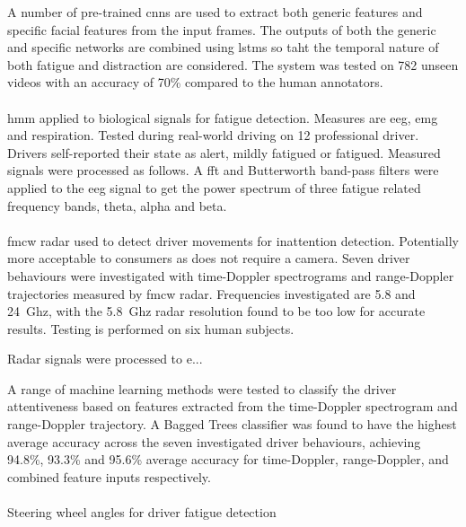 \documentclass[11pt, parskip=half*,twoside=false]{scrbook}
\begin{document}
A number of pre-trained \glspl{cnn} are used to extract both generic features and specific facial features from the input frames. The outputs of both the generic and specific networks are combined using \glspl{lstm} so taht the temporal nature of both fatigue and distraction are considered. The system was tested on 782 unseen videos with an accuracy of 70\% compared to the human annotators.

\paragraph{\citet{fuDynamicDriverFatigue2016}} \gls{hmm} applied to biological signals for fatigue detection. Measures are \gls{eeg}, \gls{emg} and respiration. Tested during real-world driving on 12 professional driver. Drivers self-reported their state as alert, mildly fatigued or fatigued. Measured signals were processed as follows. A \gls{fft} and Butterworth band-pass filters were applied to the \gls{eeg} signal to get the power spectrum of three fatigue related frequency bands, theta, alpha and beta. 

\paragraph{\citet{dingInattentiveDrivingBehavior2019}} \gls{fmcw} radar used to detect driver movements for inattention detection. Potentially more acceptable to consumers as does not require a camera. Seven driver behaviours were investigated with time-Doppler spectrograms and range-Doppler trajectories measured by \gls{fmcw} radar. Frequencies investigated are 5.8 and 24~Ghz, with the 5.8~Ghz radar resolution found to be too low for accurate results. Testing is performed on six human subjects.

Radar signals were processed to e...

A range of machine learning methods were tested to classify the driver attentiveness based on features extracted from the time-Doppler spectrogram and range-Doppler trajectory. A Bagged Trees classifier was found to have the highest average accuracy across the seven investigated driver behaviours, achieving 94.8\%, 93.3\% and 95.6\% average accuracy for time-Doppler, range-Doppler, and combined feature inputs respectively. 
 
\paragraph{\citet{liOnlineDetectionDriver2017}} Steering wheel angles for driver fatigue detection 
\end{document}
